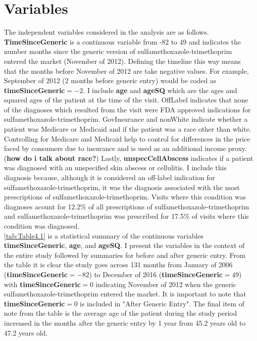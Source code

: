 \section{Variables}
The independent variables considered in the analysis are as follows. \textbf{TimeSinceGeneric} is a continuous variable from -82 to 49 and indicates the number months since the generic version of sulfamethoxazole-trimethoprim entered the market (November of 2012). Defining the timeline this way means that the months before November of 2012 are take negative values. For example, September of 2012 (2 months before generic entry) would be coded as \textbf{timeSinceGeneric}$=-2$. I include \textbf{age} and \textbf{ageSQ} which are the ages and squared ages of the patient at the time of the visit. OffLabel indicates that none of the diagnoses which resulted from the visit were FDA approved indications for sulfamethoxazole-trimethoprim. GovInsurance and nonWhite indicate whether a patient was Medicare or Medicaid and if the patient was a race other than white. Controlling for Medicare and Medicaid help to control for differences in the price faced by consumers due to insurance and is used as an additional income proxy. (\textbf{how do i talk about race?}) Lastly, \textbf{unspecCellAbscess} indicates if a patient was diagnosed with an unspecified skin abscess or cellulitis. I include this diagnosis because, although it is considered an off-label indication for sulfamethoxazole-trimethoprim, it was the diagnosis associated with the most prescriptions of sulfamethoxazole-trimethoprim. Visits where this condition was diagnoses acount for 12.2\% of all prescriptions of sulfamethoxazole-trimethoprim and sulfamethoxazole-trimethoprim was prescribed for 17.5\% of visits where this condition was diagnosed.\\
\indent \autoref{tab:Table4.1} is a statistical summary of the continuous variables \textbf{timeSinceGeneric}, \textbf{age}, and \textbf{ageSQ}. I present the variables in the context of the entire study followed by summaries for before and after generic entry. From the table it is clear the study goes across 131 months from January of 2006 (\textbf{timeSinceGeneric}$=-82$) to December of 2016 (\textbf{timeSinceGeneric}$=49$) with \textbf{timeSinceGeneric}$=0$ indicating November of 2012 when the generic sulfamethoxazole-trimethoprim entered the market. It is important to note that \textbf{timeSinceGeneric}$=0$ is included in "After Generic Entry". The final item of note from the table is the average age of the patient during the study period increased in the months after the generic entry by 1 year from 45.2 years old to 47.2 years old.\\
